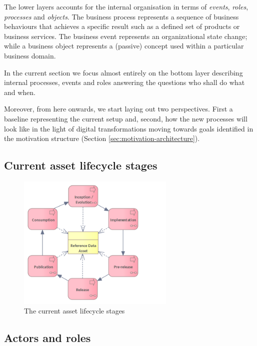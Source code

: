 	The lower layers accounts for the internal organisation in terms of \textit{events}, \textit{roles}, \textit{processes} and \textit{objects}. The business process represents a sequence of business behaviours that achieves a specific result such as a defined set of products or business services. The business event represents an organizational state change; while a business object represents a (passive) concept used within a particular business domain.
	
	In the current section we focus almost entirely on the bottom layer describing internal processes, events and roles answering the questions who shall do what and when. 
	
	Moreover, from here onwards, we start laying out two perspectives. First a baseline representing the current setup and, second, how the new processes will look like in the light of digital transformations moving towards goals identified in the motivation structure (Section \ref{sec:motivation-architecture}).
	
	\subsection{Current asset lifecycle stages}
	\label{sec:lifecycle-current-stages}
	
	\begin{figure}[h]
		\centering
		\includegraphics[width=0.67\textwidth]{images/business/Lifecycle process only (current).png}
		\caption{The current asset lifecycle stages}
		\label{fig:lifecycle-current-stages}
	\end{figure} 

	\subsection{Actors and roles}
	\label{sec:lifecycle-roles}	
	
